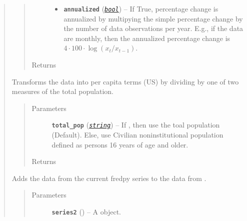 \documentclass[letterpaper,10pt,english]{sphinxmanual}
\begin{document}
\begin{fulllineitems}
\begin{quote}
\begin{fulllineitems}
\begin{quote}
\begin{description}
\begin{itemize}
\item {} 
\textbf{\texttt{annualized}} (\href{https://docs.python.org/2/library/functions.html\#bool}{\emph{\texttt{bool}}}) -- If True, percentage change is annualized by multipying the simple percentage change by the number of data observations per year. E.g., if the data are monthly, then the annualized percentage change is \(4\cdot 100\cdot\log(x_{t}/x_{t-1})\).

\end{itemize}

\item[{Returns}] \leavevmode
{\hyperref[series_class:fredpy.series]{}}

\end{description}\end{quote}

\end{fulllineitems}


\begin{fulllineitems}
\label{series_class:fredpy.series.percapita}
Transforms the data into per capita terms (US) by dividing by one of two measures of the total population.
\begin{quote}\begin{description}
\item[{Parameters}] \leavevmode
\textbf{\texttt{total\_pop}} (\href{https://docs.python.org/2/library/string.html\#module-string}{\emph{\texttt{string}}}) -- If , then use the toal population (Default). Else, use Civilian noninstitutional population defined as persons 16 years of age and older.

\item[{Returns}] \leavevmode
{\hyperref[series_class:fredpy.series]{}}

\end{description}\end{quote}

\end{fulllineitems}


\begin{fulllineitems}
\label{series_class:fredpy.series.plus}
Adds the data from the current fredpy series to the data from .
\begin{quote}\begin{description}
\item[{Parameters}] \leavevmode
\textbf{\texttt{series2}} ({\hyperref[series_class:fredpy.series]{}}) -- A  object.


\end{description}
\end{quote}
\end{fulllineitems}
\end{quote}
\end{fulllineitems}
\end{document}
